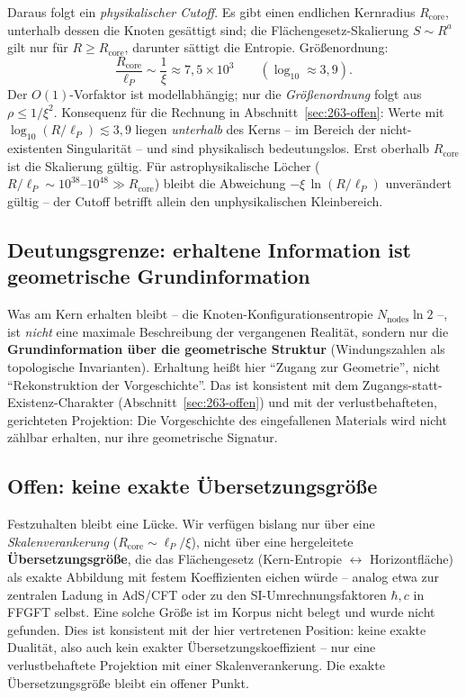 Daraus folgt ein \emph{physikalischer Cutoff}. Es gibt einen endlichen
Kernradius $R_\text{core}$, unterhalb dessen die Knoten gesättigt sind; die
Flächengesetz-Skalierung $S \sim R^{a}$ gilt nur für $R \ge R_\text{core}$,
darunter sättigt die Entropie. Größenordnung:
\[
  \frac{R_\text{core}}{\ell_P} \sim \frac{1}{\xi} \approx 7{,}5\times10^{3}
  \qquad (\log_{10} \approx 3{,}9).
\]
Der $O(1)$-Vorfaktor ist modellabhängig; nur die \emph{Größenordnung} folgt
aus $\rho \le 1/\xi^2$. Konsequenz für die Rechnung in
Abschnitt~\ref{sec:263-offen}: Werte mit $\log_{10}(R/\ell_P) \lesssim 3{,}9$
liegen \emph{unterhalb} des Kerns -- im Bereich der nicht-existenten
Singularität -- und sind physikalisch bedeutungslos. Erst oberhalb
$R_\text{core}$ ist die Skalierung gültig. Für astrophysikalische Löcher
($R/\ell_P \sim 10^{38}\text{--}10^{48} \gg R_\text{core}$) bleibt die
Abweichung $-\xi\,\ln(R/\ell_P)$ unverändert gültig -- der Cutoff betrifft
allein den unphysikalischen Kleinbereich.

\subsection*{Deutungsgrenze: erhaltene Information ist geometrische Grundinformation}

Was am Kern erhalten bleibt -- die Knoten-Konfigurationsentropie
$N_\text{nodes}\ln 2$ --, ist \emph{nicht} eine maximale Beschreibung der
vergangenen Realität, sondern nur die \textbf{Grundinformation über die
geometrische Struktur} (Windungszahlen als topologische Invarianten).
Erhaltung heißt hier \enquote{Zugang zur Geometrie}, nicht
\enquote{Rekonstruktion der Vorgeschichte}. Das ist konsistent mit dem
Zugangs-statt-Existenz-Charakter (Abschnitt~\ref{sec:263-offen}) und mit der
verlustbehafteten, gerichteten Projektion: Die Vorgeschichte des
eingefallenen Materials wird nicht zählbar erhalten, nur ihre geometrische
Signatur.

\subsection*{Offen: keine exakte Übersetzungsgröße}

Festzuhalten bleibt eine Lücke. Wir verfügen bislang nur über eine
\emph{Skalenverankerung} ($R_\text{core} \sim \ell_P/\xi$), nicht über eine
hergeleitete \textbf{Übersetzungsgröße}, die das Flächengesetz
(Kern-Entropie $\leftrightarrow$ Horizontfläche) als exakte Abbildung mit
festem Koeffizienten eichen würde -- analog etwa zur zentralen Ladung in
AdS/CFT oder zu den SI-Umrechnungsfaktoren $\hbar, c$ in FFGFT selbst. Eine
solche Größe ist im Korpus nicht belegt und wurde nicht gefunden. Dies ist
konsistent mit der hier vertretenen Position: keine exakte Dualität, also auch
kein exakter Übersetzungskoeffizient -- nur eine verlustbehaftete Projektion
mit einer Skalenverankerung. Die exakte Übersetzungsgröße bleibt ein offener
Punkt.




